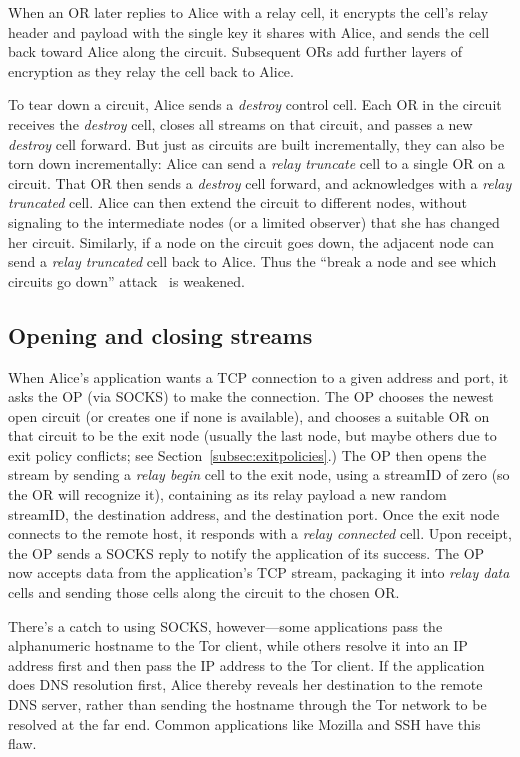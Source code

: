 \documentclass[twocolumn]{article}
\begin{document}
When an OR later replies to Alice with a relay cell, it
encrypts the cell's relay header and payload with the single key it
shares with Alice, and sends the cell back toward Alice along the
circuit.  Subsequent ORs add further layers of encryption as they
relay the cell back to Alice.

To tear down a circuit, Alice sends a \emph{destroy} control
cell. Each OR in the circuit receives the \emph{destroy} cell, closes
all streams on that circuit, and passes a new \emph{destroy} cell
forward. But just as circuits are built incrementally, they can also
be torn down incrementally: Alice can send a \emph{relay
truncate} cell to a single OR on a circuit. That OR then sends a
\emph{destroy} cell forward, and acknowledges with a
\emph{relay truncated} cell. Alice can then extend the circuit to
different nodes, without signaling to the intermediate nodes (or
a limited observer) that she has changed her circuit.
Similarly, if a node on the circuit goes down, the adjacent
node can send a \emph{relay truncated} cell back to Alice.  Thus the
``break a node and see which circuits go down''
attack~\cite{freedom21-security} is weakened.

\subsection{Opening and closing streams}
\label{subsec:tcp}

When Alice's application wants a TCP connection to a given
address and port, it asks the OP (via SOCKS) to make the
connection. The OP chooses the newest open circuit (or creates one if
none is available), and chooses a suitable OR on that circuit to be the
exit node (usually the last node, but maybe others due to exit policy
conflicts; see Section~\ref{subsec:exitpolicies}.) The OP then opens
the stream by sending a \emph{relay begin} cell to the exit node,
using a streamID of zero (so the OR will recognize it), containing as
its relay payload a new random streamID, the destination
address, and the destination port.  Once the
exit node connects to the remote host, it responds
with a \emph{relay connected} cell.  Upon receipt, the OP sends a
SOCKS reply to notify the application of its success. The OP
now accepts data from the application's TCP stream, packaging it into
\emph{relay data} cells and sending those cells along the circuit to
the chosen OR.

There's a catch to using SOCKS, however---some applications pass the
alphanumeric hostname to the Tor client, while others resolve it into
an IP address first and then pass the IP address to the Tor client. If
the application does DNS resolution first, Alice thereby reveals her
destination to the remote DNS server, rather than sending the hostname
through the Tor network to be resolved at the far end. Common applications
like Mozilla and SSH have this flaw.
\end{document}
